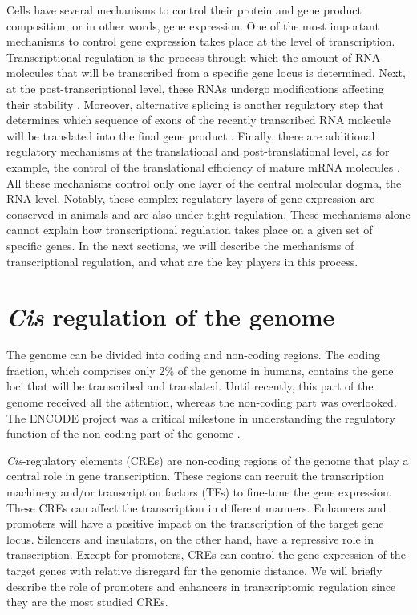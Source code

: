 Cells have several mechanisms to control their protein and gene product composition, or in other words, gene expression. One of the most important mechanisms to control gene expression takes place at the level of transcription. Transcriptional regulation is the process through which the amount of RNA molecules that will be transcribed from a specific gene locus is determined. Next, at the post-transcriptional level, these RNAs undergo modifications affecting their stability \parencite{boo_emerging_2020}. Moreover, alternative splicing is another regulatory step that determines which sequence of exons of the recently transcribed RNA molecule will be translated into the final gene product \parencite{marasco_physiology_2022}. Finally, there are additional regulatory mechanisms at the translational and post-translational level, as for example, the control of the translational efficiency of mature mRNA molecules \parencite{xue_rna_2015}. All these mechanisms control only one layer of the central molecular dogma, the RNA level. Notably, these complex regulatory layers of gene expression are conserved in animals and are also under tight regulation. These mechanisms alone cannot explain how transcriptional regulation takes place on a given set of specific genes. In the next sections, we will describe the mechanisms of transcriptional regulation, and what are the key players in this process.

\section{\textit{Cis} regulation of the genome}



The genome can be divided into coding and non-coding regions. The coding fraction, which comprises only 2\% of the genome in humans, contains the gene loci that will be transcribed and translated.  Until recently, this part of the genome received all the attention, whereas the non-coding part was overlooked. The ENCODE project was a critical milestone in understanding the regulatory function of the non-coding part of the genome \parencite{consortium_integrated_2012}. 


\textit{Cis}-regulatory elements (CREs) are non-coding regions of the genome that play a central role in gene transcription. These regions can recruit the transcription machinery and/or transcription factors (TFs) to fine-tune the gene expression. These CREs can affect the transcription in different manners. Enhancers and promoters will have a positive impact on the transcription of the target gene locus. Silencers and insulators, on the other hand, have a repressive role in transcription. Except for promoters, CREs can control the gene expression of the target genes with relative disregard for the genomic distance. We will briefly describe the role of promoters and enhancers in transcriptomic regulation since they are the most studied CREs.

